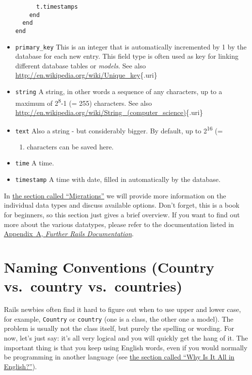 \documentclass[a4paper]{book}
\newcounter{tab}[chapter]
\newcommand{\chap}[1]{\newpage\thispagestyle{empty}\chapter{#1}\label{chap:\thechapter}}
\begin{document}
\begin{itemize}
\begin{shaded}
\begin{verbatim}
      t.timestamps
    end
  end
end
\end{verbatim}\end{shaded}
\item
  \texttt{primary\_key} This is an integer that is automatically incremented by 1 by the database for each new entry. This field type is often used as key for linking different database tables or \emph{models}. See also \url{http://en.wikipedia.org/wiki/Unique_key}\{.uri\}
\item
  \texttt{string} A string, in other words a sequence of any characters, up to a maximum of 2\textsuperscript{8}-1 (= 255) characters. See also \url{http://en.wikipedia.org/wiki/String_(computer_science)}\{.uri\}
\item
  \texttt{text} Also a string - but considerably bigger. By default, up to 2\textsuperscript{16} (=

  \begin{enumerate}
  \def\labelenumi{\arabic{enumi})}
  \setcounter{enumi}{65535}
  \itemsep1pt\parskip0pt
  \item
    characters can be saved here.
  \end{enumerate}
\item
  \texttt{time} A time.
\item
  \texttt{timestamp} A time with date, filled in automatically by the database.
\end{itemize}

In \hyperref[activerecordux5fmigration]{the section called “Migrations”} we will provide more information on the individual data types and discuss available options. Don't forget, this is a book for beginners, so this section just gives a brief overview. If you want to find out more about the various datatypes, please refer to the documentation listed in \hyperref[weiterfuehrendeux5fdoku]{Appendix~A, \emph{Further Rails Documentation}}.

\chap{Naming Conventions (Country vs.~country vs.~countries)}\label{naming-conventions-country-vs.country-vs.countries}

Rails newbies often find it hard to figure out when to use upper and lower case, for example, \texttt{Country} or \texttt{country} (one is a class, the other one a model). The problem is usually not the class itself, but purely the spelling or wording. For now, let's just say: it's all very logical and you will quickly get the hang of it. The important thing is that you keep using English words, even if you would normally be programming in another language (see \hyperref[warumux5fenglish]{the section called “Why Is It All in English?”}).
\end{document}
